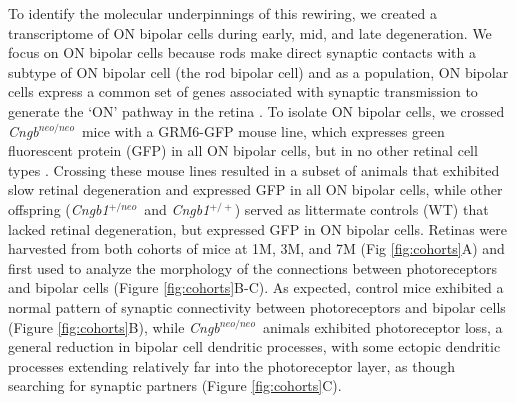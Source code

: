 \documentclass[11pt, a4paper]{article}
\newcommand{\cngb}{\textit{Cngb$^{neo/neo}$}~}
\newcommand{\cngbwt}{\textit{Cngb1$^{+/neo}$}~}
\begin{document}
To identify the molecular underpinnings of this rewiring, we created a transcriptome of ON bipolar cells during early, mid, and late degeneration. We focus on ON bipolar cells because rods make direct synaptic contacts with a subtype of ON bipolar cell (the rod bipolar cell) and as a population, ON bipolar cells express a common set of genes associated with synaptic transmission to generate the ‘ON’ pathway in the retina \citep{Kolb1983-cd, Slaughter1981-pi, Kuo2025}. To isolate ON bipolar cells,  we crossed \cngb mice with a GRM6-GFP mouse line, which expresses green fluorescent protein (GFP) in all ON bipolar cells, but in no other retinal cell types \citep{Dhingra2008}. Crossing these mouse lines resulted in a subset of animals that exhibited slow retinal degeneration and expressed GFP in all ON bipolar cells, while other offspring (\cngbwt and \textit{Cngb1$^{+/+}$}) served as littermate controls (WT) that lacked retinal degeneration, but expressed GFP in ON bipolar cells. Retinas were harvested from both cohorts of mice at 1M, 3M, and 7M (Fig \ref{fig:cohorts}A) and first used to analyze the morphology of the connections between photoreceptors and bipolar cells (Figure \ref{fig:cohorts}B-C). As expected, control mice exhibited a normal pattern of synaptic connectivity between photoreceptors and bipolar cells (Figure \ref{fig:cohorts}B), while \cngb animals exhibited photoreceptor loss, a general reduction in bipolar cell dendritic processes, with some ectopic dendritic processes extending relatively far into the photoreceptor layer, as though searching for synaptic partners (Figure \ref{fig:cohorts}C). 
\end{document}
